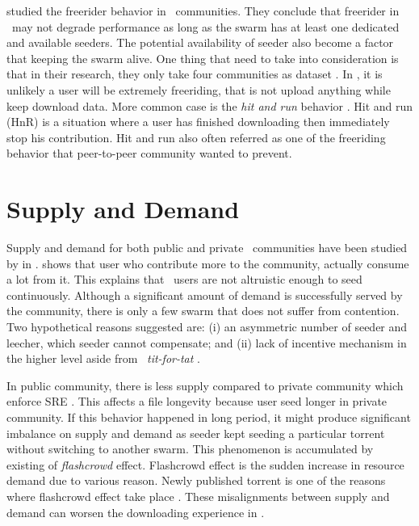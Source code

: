 \citeauthor{2015:freeriderinbtcommunity:das} studied the freerider behavior in \bt~communities. They conclude that freerider in \bt~may not degrade performance as long as the swarm has at least one dedicated and available seeders. The potential availability of seeder also become a factor that keeping the swarm alive. One thing that need to take into consideration is that in their research, they only take four communities as dataset \cite{2015:freeriderinbtcommunity:das}. In \bt, it is unlikely a user will be extremely freeriding, that is not upload anything while keep download data. More common case is the \textit{hit and run} behavior \cite{2011:managesupplydemand:meulpolder}. Hit and run (HnR) is a situation where a user has finished downloading then immediately stop his contribution. Hit and run also often referred as one of the freeriding behavior that peer-to-peer community wanted to prevent.



\section{Supply and Demand}
Supply and demand for both public and private \bt~communities have been studied by \citeauthor{2009:demandsupplyres:andrade} in \citeyear{2009:demandsupplyres:andrade}. \citeauthor{2009:demandsupplyres:andrade} shows that user who contribute more to the community, actually consume a lot from it. This explains that \bt~users are not altruistic enough to seed continuously. Although a significant amount of demand is successfully served by the community, there is only a few swarm that does not suffer from contention. Two hypothetical reasons \citeauthor{2009:demandsupplyres:andrade} suggested are: (i) an asymmetric number of seeder and leecher, which seeder cannot compensate; and (ii) lack of incentive mechanism in the higher level aside from \bt~\textit{tit-for-tat} \cite{2009:demandsupplyres:andrade}. 

In public community, there is less supply compared to private community which enforce SRE \cite{2009:demandsupplyres:andrade}. This affects a file longevity because user seed longer in private community. If this behavior happened in long period, it might produce significant imbalance on supply and demand as seeder kept seeding a particular torrent without switching to another swarm. This phenomenon is accumulated by existing of \textit{flashcrowd} effect. Flashcrowd effect is the sudden increase in resource demand due to various reason. Newly published torrent is one of the reasons where flashcrowd effect take place \cite{2013:swarmevolution:su}. These misalignments between supply and demand can worsen the downloading experience in \bt.

